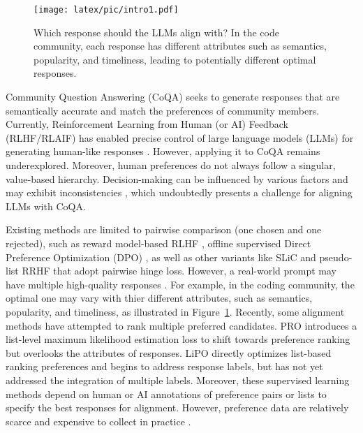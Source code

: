 \begin{figure}
    \centering
    \texttt{[image: latex/pic/intro1.pdf]}
    \caption{Which response should the LLMs align with? In the code community, each response has different attributes such as semantics, popularity, and timeliness, leading to potentially different optimal responses.}
    \label{intro}
\end{figure}
Community Question Answering (CoQA) \cite{romeo2018flexible,wu2018question} seeks to generate responses that are semantically accurate and 
match the preferences of community members.
Currently, Reinforcement Learning from Human (or AI) Feedback (RLHF/RLAIF) \cite{christiano2017deep, bai2022constitutional} has enabled precise control of large language models (LLMs) for generating human-like responses \cite{stiennon2020learning, ouyang2022training}. 
However, applying it to CoQA remains underexplored.
Moreover, human preferences do not always follow a singular, value-based hierarchy. 
Decision-making can be influenced by various factors and may exhibit inconsistencies \cite{tversky1969intransitivity}, which undoubtedly presents a challenge for aligning LLMs with CoQA.


Existing methods are limited to pairwise comparison (one chosen and one rejected), such as reward model-based RLHF \cite{ouyang2022training}, offline supervised Direct Preference Optimization (DPO) \cite{rafailov2024direct}, as well as other variants like SLiC \cite{zhao2023slic} and pseudo-list RRHF \cite{yuan2024rrhf} that adopt pairwise hinge loss.
However, a real-world prompt may have multiple high-quality responses \cite{cui2023ultrafeedback}.
For example, in the coding community, the optimal one may vary with thier different attributes, such as semantics, popularity, and timeliness, as illustrated in Figure~\ref{intro}. 
Recently, some alignment methods have attempted to rank multiple preferred candidates.
PRO \cite{song2024preference} introduces a list-level maximum likelihood estimation loss to shift towards preference ranking but overlooks the attributes of responses. 
LiPO \cite{liu2024lipo} directly optimizes list-based ranking preferences and begins to address response labels, but has not yet addressed the integration of multiple labels.
Moreover, these supervised learning methods depend on human or AI annotations of preference pairs or lists to specify the best responses for alignment. However, preference data are relatively scarce and expensive to collect in practice \cite{casper2023open}.


